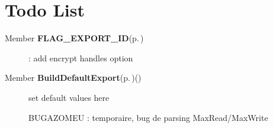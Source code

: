 \section{Todo List}\label{todo}
\label{todo__todo000001}
 \begin{description}
\item[Member {\bf FLAG\_\-EXPORT\_\-ID}{\rm (p.\,\pageref{exports_8c_a27})} ]: add encrypt handles option\end{description}


\label{todo__todo000004}
 \begin{description}
\item[Member {\bf Build\-Default\-Export}{\rm (p.\,\pageref{exports_8c_a72})}() ]set default values here 

BUGAZOMEU : temporaire, bug de parsing Max\-Read/Max\-Write\end{description}
